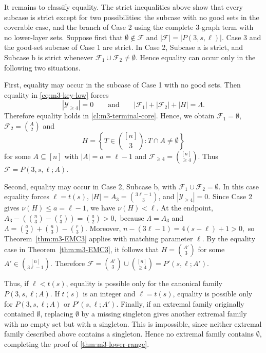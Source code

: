 \documentclass[10pt,a4paper]{article}
\numberwithin{equation}{section}
\theoremstyle{definition}
\newcommand{\F}{\mathcal F}
\newcommand{\Y}{\mathcal Y}
\begin{document}
It remains to classify equality.  The strict inequalities above show that
every subcase is strict except for two possibilities: the subcase with no good sets in
the coverable case, and the branch of Case 2 using the complete $3$-graph term with no lower-layer
sets.  Suppose first that \(\emptyset\notin\F\) and
\(|\F|=|P(3,s,\ell)|\).  Case 3 and the good-set subcase of Case 1 are
strict.  In Case 2, Subcase a is strict, and Subcase b is strict whenever
\(\F_1\cup\F_2\ne\emptyset\).  Hence equality can occur only in the
following two situations.

First, equality may occur in the subcase of Case 1 with no good sets.  Then equality in
\eqref{eq:m3-key-low} forces
\[
    |\Y_{\ge4}|=0
    \qquad\text{and}\qquad
    |\F_1|+|\F_2|+|H|=\Lambda.
\]
Therefore equality holds in \cref{cl:m3-terminal-core}.  Hence, we obtain $\F_1=\emptyset$, $\F_2=\binom A2$ and
\[
    H=
    \left\{T\in\binom{[n]}3:T\cap A\ne\emptyset\right\}
\]
for some \(A\subseteq[n]\) with \(|A|=a=\ell-1\) and $\F_{\ge4}=\binom{[n]}{\ge4}$.
Thus
\(\F=P(3,s,\ell;A).\)

Second, equality may occur in Case 2, Subcase b, with
\(\F_1\cup\F_2=\emptyset\).  In this case equality forces
\(\ell=t(s)\), \(|H|=A_3=\binom{3\ell-1}{3}\), and \(|\Y_{\ge4}|=0\).
Since Case 2 gives \(\nu(H)\le a=\ell-1\), we have \(\nu(H)<\ell\).  At the
endpoint,
\(A_3- \left(\binom n3-\binom r3\right) = \binom a2>0,\)
because \(\Lambda=A_3\) and
\(\Lambda=\binom a2+\binom n3-\binom r3.\)
Moreover,
\(n-(3\ell-1)=4(s-\ell)+1>0,\)
so Theorem~\ref{thm:m3-EMC3} applies with matching parameter \(\ell\).
By the equality case in Theorem~\ref{thm:m3-EMC3}, it follows that
\(H=\binom{A'}3\)
for some \(A'\in\binom{[n]}{3\ell-1}\).  Therefore
\(\F=\binom{A'}3\cup\binom{[n]}{\ge4} = P'(s,\ell;A').\)

Thus, if \(\ell<t(s)\), equality is possible only for the canonical family
\(P(3,s,\ell;A)\).  If \(t(s)\) is an integer and \(\ell=t(s)\), equality is possible only for
\(P(3,s,\ell;A)\) or \(P'(s,\ell;A')\).
Finally, if an extremal family originally contained \(\emptyset\), replacing
\(\emptyset\) by a missing singleton gives another extremal family with no
empty set but with a singleton.  This is impossible, since neither extremal
family described above contains a singleton.  Hence no extremal family
contains \(\emptyset\), completing the proof of \cref{thm:m3-lower-range}.
\end{document}
